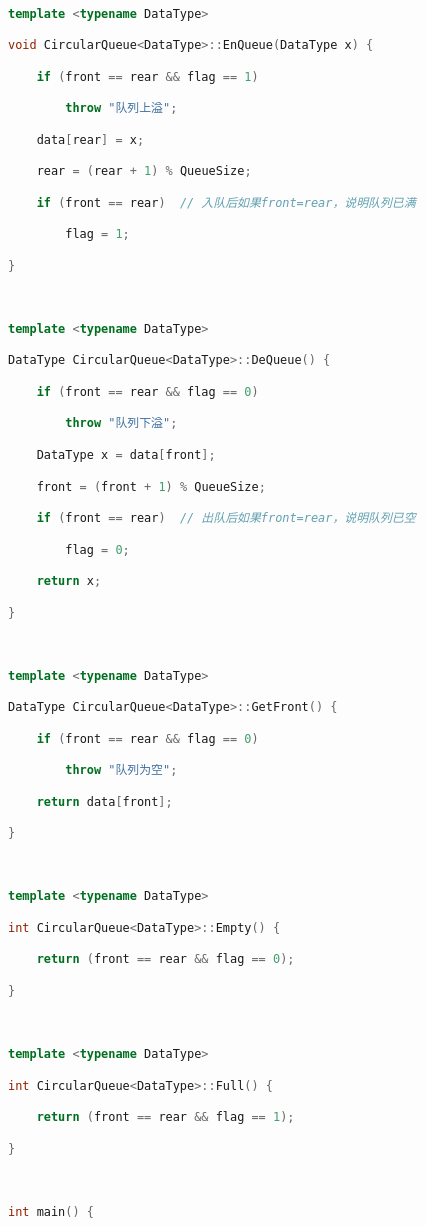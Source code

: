 \begin{lstlisting}[language=C++]
  

template <typename DataType>

void CircularQueue<DataType>::EnQueue(DataType x) {

    if (front == rear && flag == 1)

        throw "队列上溢";

    data[rear] = x;

    rear = (rear + 1) % QueueSize;

    if (front == rear)  // 入队后如果front=rear，说明队列已满

        flag = 1;

}

  

template <typename DataType>

DataType CircularQueue<DataType>::DeQueue() {

    if (front == rear && flag == 0)

        throw "队列下溢";

    DataType x = data[front];

    front = (front + 1) % QueueSize;

    if (front == rear)  // 出队后如果front=rear，说明队列已空

        flag = 0;

    return x;

}

  

template <typename DataType>

DataType CircularQueue<DataType>::GetFront() {

    if (front == rear && flag == 0)

        throw "队列为空";

    return data[front];

}

  

template <typename DataType>

int CircularQueue<DataType>::Empty() {

    return (front == rear && flag == 0);

}

  

template <typename DataType>

int CircularQueue<DataType>::Full() {

    return (front == rear && flag == 1);

}

  

int main() {


\end{lstlisting}
